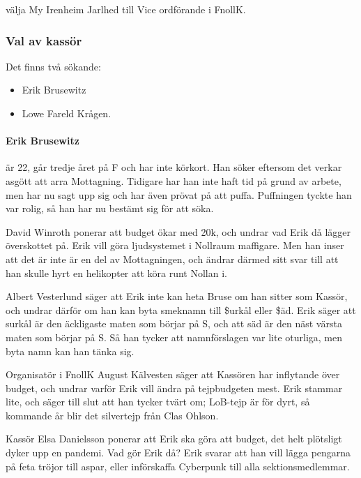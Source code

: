 \documentclass[hidelinks]{sektionsmote}
\begin{document}
\begin{beslut}
  \item välja My Irenheim Jarlhed till Vice ordförande i FnollK.
\end{beslut}

\subsubsection{Val av kassör}
Det finns två sökande:
\begin{itemize}
    \item Erik Brusewitz
    \item Lowe Fareld Krågen.
\end{itemize}

\paragraph{Erik Brusewitz} är 22, går tredje året på F och har inte körkort.
Han söker eftersom det verkar asgött att arra Mottagning.
Tidigare har han inte haft tid på grund av arbete, men har nu sagt upp sig och har även prövat på att puffa.
Puffningen tyckte han var rolig, så han har nu bestämt sig för att söka.\par
David Winroth ponerar att budget ökar med 20k, och undrar vad Erik då lägger överskottet på.
Erik vill göra ljudsystemet i Nollraum maffigare.
Men han inser att det är inte är en del av Mottagningen, och ändrar därmed sitt svar till att han skulle hyrt en helikopter att köra runt Nollan i.\par
Albert Vesterlund säger att Erik inte kan heta Bruse om han sitter som Kassör, och undrar därför om han kan byta smeknamn till \$urkål eller \$äd.
Erik säger att surkål är den äckligaste maten som börjar på S, och att säd är den näst värsta maten som börjar på S.
Så han tycker att namnförslagen var lite oturliga, men byta namn kan han tänka sig.\par
Organisatör i FnollK August Kälvesten säger att Kassören har inflytande över budget, och undrar varför Erik vill ändra på tejpbudgeten mest.
Erik stammar lite, och säger till slut att han tycker tvärt om;
LoB-tejp är för dyrt, så kommande år blir det silvertejp från Clas Ohlson.\par
Kassör Elsa Danielsson ponerar att Erik ska göra att budget, det helt plötsligt dyker upp en pandemi.
Vad gör Erik då?
Erik svarar att han vill lägga pengarna på feta tröjor till aspar, eller införskaffa Cyberpunk till alla sektionsmedlemmar.\par
\end{document}
